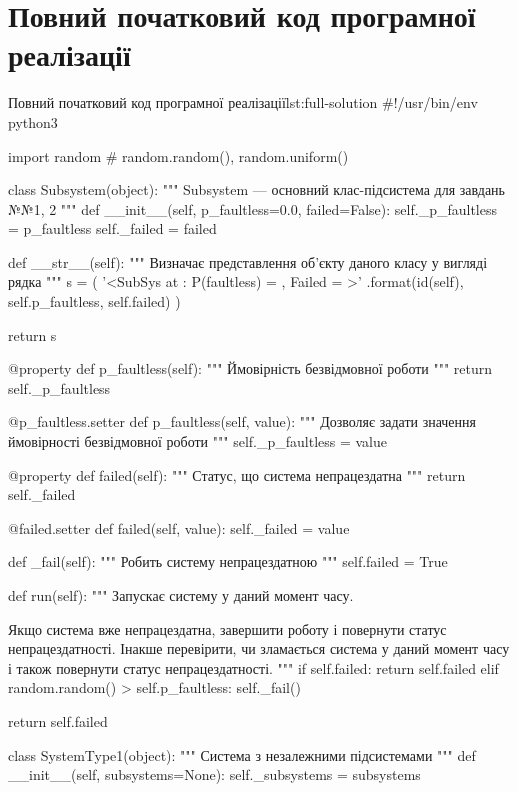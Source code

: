\documentclass[
	a4paper,
	oneside,
	BCOR = 10mm,
	DIV = 12,
	12pt,
	headings = normal,
]{scrartcl}
\begin{document}
		\section{Повний початковий код програмної реалізації}
		\label{sec:full-listing}
			\begin{listingpython}[toprule = 0pt, bottomrule = 0pt]{Повний початковий код програмної реалізації}{lst:full-solution}
#!/usr/bin/env python3

import random  # random.random(), random.uniform()


class Subsystem(object):
    """ Subsystem --- основний клас-підсистема для завдань №№1, 2
    """
    def __init__(self, p_faultless=0.0, failed=False):
        self._p_faultless = p_faultless
        self._failed = failed

    def __str__(self):
        """ Визначає представлення об'єкту даного класу у вигляді рядка """
        s = (
            '<SubSys at {}: P(faultless) = {}, Failed = {}>'
            .format(id(self), self.p_faultless, self.failed)
        )

        return s

    @property
    def p_faultless(self):
        """ Ймовірність безвідмовної роботи """
        return self._p_faultless

    @p_faultless.setter
    def p_faultless(self, value):
        """ Дозволяє задати значення ймовірності безвідмовної роботи """
        self._p_faultless = value

    @property
    def failed(self):
        """ Статус, що система непрацездатна """
        return self._failed

    @failed.setter
    def failed(self, value):
        self._failed = value

    def _fail(self):
        """ Робить систему непрацездатною """
        self.failed = True

    def run(self):
        """ Запускає систему у даний момент часу.

        Якщо система вже непрацездатна, завершити роботу і повернути статус
        непрацездатності. Інакше перевірити, чи зламається система у даний
        момент часу і також повернути статус непрацездатності.
        """
        if self.failed:
            return self.failed
        elif random.random() > self.p_faultless:
            self._fail()

        return self.failed


class SystemType1(object):
    """ Система з незалежними підсистемами """
    def __init__(self, subsystems=None):
        self._subsystems = subsystems


\end{listingpython}
\end{document}

